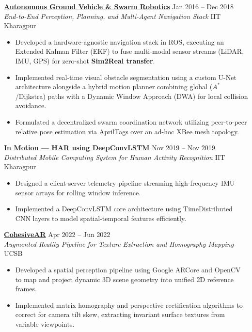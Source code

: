 \documentclass[10pt,letterpaper]{article}
\begin{document}
\noindent
\textbf{\href{https://satyam-aw.github.io/projects/autonomous_ground_vehicle_and_swarm_robotics/}{Autonomous Ground Vehicle \& Swarm Robotics}} \hfill Jan 2016 – Dec 2018  \\
\textit{End-to-End Perception, Planning, and Multi-Agent Navigation Stack}  \hfill IIT Kharagpur
\begin{itemize}
    \item Developed a hardware-agnostic navigation stack in ROS, executing an Extended Kalman Filter (EKF) to fuse multi-modal sensor streams (LiDAR, IMU, GPS) for zero-shot \textbf{Sim2Real transfer}.
    \item Implemented real-time visual obstacle segmentation using a custom U-Net architecture alongside a hybrid motion planner combining global ($A^*$/Dijkstra) paths with a Dynamic Window Approach (DWA) for local collision avoidance.
    \item Formulated a decentralized swarm coordination network utilizing peer-to-peer relative pose estimation via AprilTags over an ad-hoc XBee mesh topology.
\end{itemize}


\noindent
\textbf{\href{https://satyam-aw.github.io/projects/in_motion_har_deepconvlstm/}{In Motion — HAR using DeepConvLSTM}}  \hfill Nov 2019 – Nov 2019 \\
\textit{Distributed Mobile Computing System for Human Activity Recognition} \hfill IIT Kharagpur 
\begin{itemize}
    \item Designed a client-server telemetry pipeline streaming high-frequency IMU sensor arrays for rolling window inference.
    \item Implemented a DeepConvLSTM core architecture using TimeDistributed CNN layers to model spatial-temporal features efficiently.
\end{itemize}

\noindent
\textbf{\href{https://satyam-aw.github.io/projects/cohesive_ar/}{CohesiveAR}}  \hfill Apr 2022 – Jun 2022 \\
\textit{Augmented Reality Pipeline for Texture Extraction and Homography Mapping} \hfill UCSB 
\begin{itemize}
    \item Developed a spatial perception pipeline using Google ARCore and OpenCV to map and project dynamic 3D scene geometry into unified 2D reference frames.
    \item Implemented matrix homography and perspective rectification algorithms to correct for camera tilt skew, extracting invariant surface textures from variable viewpoints.
\end{itemize}
\end{document}
